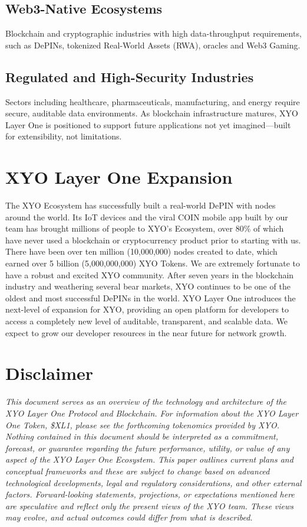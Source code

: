 \documentclass{article}
\begin{document}
\subsection{Web3-Native Ecosystems}
Blockchain and cryptographic industries with high data-throughput requirements, such as DePINs, tokenized Real-World Assets (RWA), oracles and Web3 Gaming.

\subsection{Regulated and High-Security Industries}
Sectors including healthcare, pharmaceuticals, manufacturing, and energy require secure, auditable data environments.
As blockchain infrastructure matures, XYO Layer One is positioned to support future applications not yet imagined—built for extensibility, not limitations.

\section{XYO Layer One Expansion}
The XYO Ecosystem has successfully built a real-world DePIN with nodes around the world. Its IoT devices and the viral COIN mobile app built by our team has brought millions of people to XYO's Ecosystem, over 80\% of which have never used a blockchain or cryptocurrency product prior to starting with us. There have been over ten million (10,000,000) nodes created to date, which earned over 5 billion (5,000,000,000) XYO Tokens. We are extremely fortunate to have a robust and excited XYO community. After seven years in the blockchain industry and weathering several bear markets, XYO continues to be one of the oldest and most successful DePINs in the world. XYO Layer One introduces the next-level of expansion for XYO, providing an open platform for developers to access a completely new level of auditable, transparent, and scalable data. We expect to grow our developer resources in the near future for network growth.

\newpage
\section*{Disclaimer}
\textit{This document serves as an overview of the technology and architecture of the XYO Layer One Protocol and Blockchain. For information about the XYO Layer One Token, \$XL1, please see the forthcoming tokenomics provided by XYO.
Nothing contained in this document should be interpreted as a commitment, forecast, or guarantee regarding the future performance, utility, or value of any aspect of the XYO Layer One Ecosystem. This paper outlines current plans and conceptual frameworks and these are subject to change based on advanced technological developments, legal and regulatory considerations, and other external factors. Forward-looking statements, projections, or expectations mentioned here are speculative and reflect only the present views of the XYO team. These views may evolve, and actual outcomes could differ from what is described.}
\end{document}
